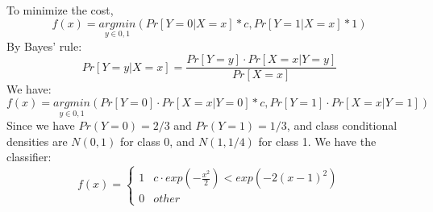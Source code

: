 \documentclass[twoside,11pt]{homework}
\begin{document}
To minimize the cost,
\[
f(x) = \underset {y \in {0, 1}}{argmin} (Pr[Y=0|X=x]*c ,  Pr[Y=1|X=x]*1)
\] 
By Bayes' rule:
\[
Pr[Y=y|X=x] = \frac{Pr[Y=y]\cdot Pr[X=x|Y=y]} {Pr[X=x]}
\] 
We have:
\[
f(x) = \underset {y \in {0, 1}}{argmin} (Pr[Y=0]\cdot Pr[X=x|Y=0]*c ,  Pr[Y=1]\cdot Pr[X=x|Y=1])
\] 
Since we have $Pr(Y=0) = 2/3$ and $Pr(Y=1) = 1/3$, and class conditional densities are $N(0,1)$ for class 0, and $N(1, 1/4)$ for class 1. We have the classifier:
\[
f(x) =
\begin{cases} 
1 & c\cdot exp(-\frac{x^2}{2}) < exp(-2(x-1)^2) \\
0 & other
\end{cases}
\] \\
\end{document}
